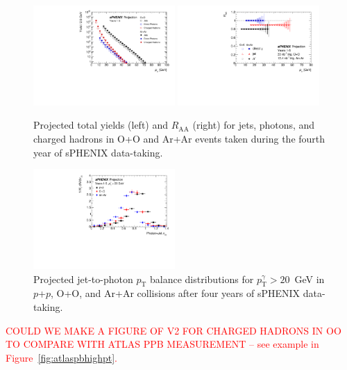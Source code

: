\begin{figure}[h]
\centering
\includegraphics[width=0.48\textwidth]{figs/master_SmallSystems_yields.pdf}
\includegraphics[width=0.48\textwidth]{figs/RAA_SmallSystems.pdf}
\caption{Projected total yields (left) and $R_\mathrm{AA}$ (right) for
  jets, photons, and charged hadrons in O+O and Ar+Ar events taken during the fourth year of sPHENIX data-taking.}
\label{fig:jet_RAA_SmallSystems}
\end{figure}

\begin{figure}[h]
\centering
\includegraphics[width=0.48\textwidth]{figs/xJg_3}
\caption{Projected jet-to-photon $p_\mathrm{T}$ balance distributions for $p_\mathrm{T}^{\gamma} > 20$~GeV in $p$+$p$, O+O, and Ar+Ar collisions after four years of sPHENIX data-taking.}
\label{fig:jet_xJg_SmallSystems}
\end{figure}

{\textcolor{red}{COULD WE MAKE A FIGURE OF V2 FOR CHARGED HADRONS IN OO TO COMPARE WITH ATLAS PPB MEASUREMENT -- see example in Figure~\ref{fig:atlaspbhighpt}.}} {\color{red}{DVP: Yes, but after the initial circulation to the Collaboration}}

